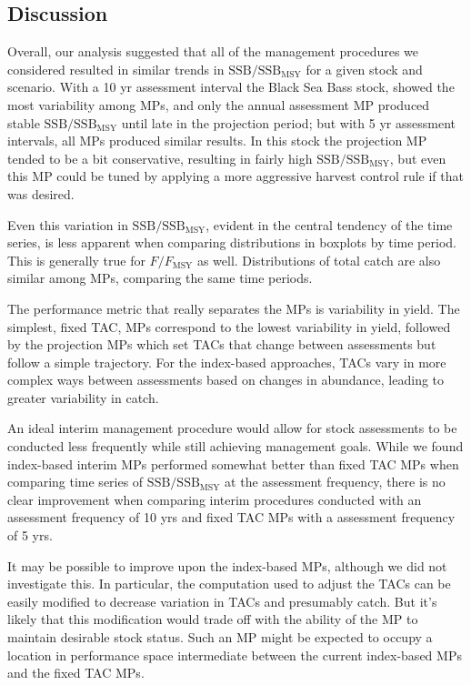 \documentclass[12pt,english]{article}
\begin{document}
\begin{flushleft}
\begin{spacing}{1.9}
\section*{Discussion}

Overall, our analysis suggested that all of the management procedures we considered resulted in similar trends in $\mathrm{SSB/SSB_{MSY}}$ for a given stock and scenario. With a 10 yr assessment interval the Black Sea Bass stock, showed the most variability among MPs, and only the annual assessment MP produced stable $\mathrm{SSB/SSB_{MSY}}$ until late in the projection period; but with 5 yr assessment intervals, all MPs produced similar results. In this stock the projection MP tended to be a bit conservative, resulting in fairly high $\mathrm{SSB/SSB_{MSY}}$, but even this MP could be tuned by applying a more aggressive harvest control rule if that was desired.

Even this variation in $\mathrm{SSB/SSB_{MSY}}$, evident in the central tendency of the time series, is less apparent when comparing distributions in boxplots by time period. This is generally true for $F/F_{\mathrm{MSY}}$ as well. Distributions of total catch are also similar among MPs, comparing the same time periods.

The performance metric that really separates the MPs is variability in yield. The simplest, fixed TAC, MPs correspond to the lowest variability in yield, followed by the projection MPs which set TACs that change between assessments but follow a simple trajectory. For the index-based approaches, TACs vary in more complex ways between assessments based on changes in abundance, leading to greater variability in catch.

An ideal interim management procedure would allow for stock assessments to be conducted less frequently while still achieving management goals. While we found index-based interim MPs performed somewhat better than fixed TAC MPs when comparing time series of $\mathrm{SSB/SSB_{MSY}}$ at the assessment frequency, there is no clear improvement when comparing interim procedures conducted with an assessment frequency of 10 yrs and fixed TAC MPs with a assessment frequency of 5 yrs.

It may be possible to improve upon the index-based MPs, although we did not investigate this. In particular, the computation used to adjust the TACs can be easily modified to decrease variation in TACs and presumably catch. But it's likely that this modification would trade off with the ability of the MP to maintain desirable stock status. Such an MP might be expected to occupy a location in performance space intermediate between the current index-based MPs and the fixed TAC MPs.


\end{spacing}
\end{flushleft}
\end{document}
